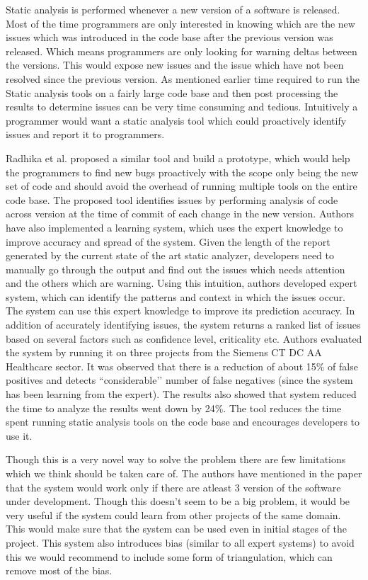 \documentclass[10pt, conference, compsocconf]{IEEEtran}
\begin{document}
Static analysis is performed whenever a new version of a software is released. Most of the time programmers are only interested in knowing which are the new issues which was introduced in the code base after the previous version was released. Which means programmers are only looking for warning deltas between the versions. This would expose new issues and the issue which have not been resolved since the previous version. As mentioned earlier time required to run the Static analysis tools on a fairly large code base and then post processing the results to determine issues can be very time consuming and tedious. Intuitively a programmer would want a static analysis tool which could proactively identify issues and report it to programmers.  

Radhika et al.\cite{venkatasubramanyam2014automated} proposed a similar tool and build a prototype, which would help the programmers to find new bugs proactively with the scope only being the new set of code and should avoid the overhead of running multiple tools on the entire code base.  The proposed tool identifies issues by performing analysis of code across version at the time of commit of each change in the new version. Authors have also implemented a learning system, which uses the expert knowledge to improve accuracy and spread of the system. Given the length of the report generated by the current state of the art static analyzer, developers need to manually go through the output and find out the issues which needs attention and the others which are warning. Using this intuition, authors developed expert system, which can identify the patterns and context in which the issues occur. The system can use this expert knowledge to improve its prediction accuracy. In addition of accurately identifying issues, the system returns a ranked list of issues based on several factors such as confidence level, criticality etc. Authors evaluated the system by running it on three projects from the Siemens CT DC AA Healthcare sector. It was observed that there is a reduction of about 15\% of false positives and detects ``considerable’’ number of false negatives (since the system has been learning from the expert). The results also showed that system reduced the time to analyze the results went down by 24\%. The tool reduces the time spent running static analysis tools on the code base and encourages developers to use it. 

Though this is a very novel way to solve the problem there are few limitations which we think should be taken care of. The authors have mentioned in the paper that the system would work only if there are atleast 3 version of the software under development. Though this doesn’t seem to be a big problem, it would be very useful if the system could learn from other projects of the same domain. This would make sure that the system can be used even in initial stages of the project. This system also introduces bias (similar to all expert systems) to avoid this we would recommend to include  some form of triangulation, which can remove most of the bias.
\end{document}
